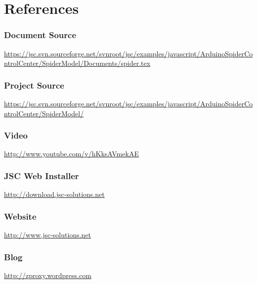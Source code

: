 \documentclass[12pt,leqno]{book}
\begin{document}
\chapter{References}

\subsection{Document Source}

\url{https://jsc.svn.sourceforge.net/svnroot/jsc/examples/javascript/ArduinoSpiderControlCenter/SpiderModel/Documents/spider.tex}

\subsection{Project Source}
\url{https://jsc.svn.sourceforge.net/svnroot/jsc/examples/javascript/ArduinoSpiderControlCenter/SpiderModel/}



\subsection{Video}
\url{http://www.youtube.com/v/hKksAVmekAE}

\subsection{JSC Web Installer}
\url{http://download.jsc-solutions.net}

\subsection{Website}
\url{http://www.jsc-solutions.net}

\subsection{Blog}
\url{http://zproxy.wordpress.com}
\end{document}

